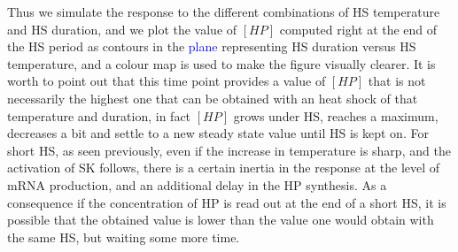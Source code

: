 \documentclass[oneside, 10pt, a4paper, twocolumn]{article}
\begin{document}
Thus we simulate the response to the different combinations of HS temperature and HS duration, and we plot the value of $\left[HP\right]$ computed right at the end of the HS period as contours in the \textcolor{blue}{plane} representing HS duration versus HS temperature, and a colour map is used to make the figure visually clearer. 
It is worth to point out that this time point provides a value of $\left[HP\right]$ that is not necessarily the highest one that can be obtained with an heat shock of that temperature and duration, in fact $\left[HP\right]$ grows under HS, reaches a maximum, decreases a bit and settle to a new steady state value until HS is kept on. %
For short HS, as seen previously, even if the increase in temperature is sharp, and the activation of SK follows, there is a certain inertia in the response at the level of mRNA production, and an additional delay in the HP synthesis. As a consequence if the concentration of HP is read out at the end of a short HS, it is possible that the obtained value is lower than the value one would obtain with the same HS, but waiting some more time. %
\end{document}
